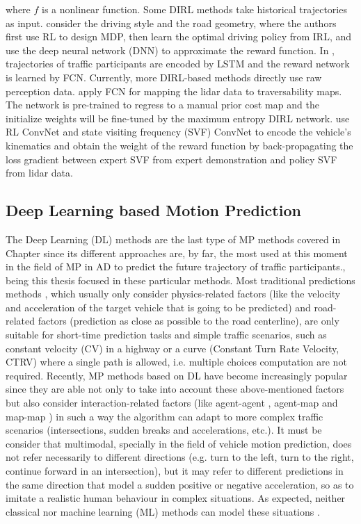 where $f$ is a nonlinear function. Some DIRL methods take historical trajectories as input. \cite{you2019advanced} consider the driving style and the road geometry, where the authors first use RL to design MDP, then learn the optimal driving policy from IRL, and use the deep neural network (DNN) to approximate the reward function. In \cite{fernando2020deep}, trajectories of traffic participants are encoded by LSTM and the reward network is learned by FCN. Currently, more DIRL-based methods directly use raw perception data. \cite{wulfmeier2017large} apply FCN for mapping the lidar data to traversability maps. The network is pre-trained to regress to a manual prior cost map and the initialize weights will be fine-tuned by the maximum entropy DIRL network. \cite{zhu2020off} use RL ConvNet and state visiting frequency (SVF) ConvNet to encode the vehicle’s kinematics and obtain the weight of the reward function by back-propagating the loss gradient \cite{wulfmeier2016watch} between expert SVF from expert demonstration and policy SVF from lidar data.

\subsection{Deep Learning based Motion Prediction}
\label{sec:2_dl_based_mp}

The Deep Learning (DL) methods are the last type of \ac{MP} methods covered in Chapter since its different approaches are, by far, the most used at this moment in the field of \ac{MP} in \ac{AD} to predict the future trajectory of traffic participants., being this thesis focused in these particular methods. Most traditional predictions methods \cite{huang2022survey}, which usually only consider physics-related factors (like the velocity and acceleration of the target vehicle that is going to be predicted) and road-related factors (prediction as close as possible to the road centerline), are only suitable for short-time prediction tasks \cite{huang2022survey} and simple traffic scenarios, such as constant velocity (CV) in a highway or a curve (Constant Turn Rate Velocity, CTRV) where a single path is allowed, i.e. multiple choices computation are not required. Recently, MP methods based on DL have become increasingly popular since they are able not only to take into account these above-mentioned factors but also consider interaction-related factors (like agent-agent \cite{gupta2018social}, agent-map \cite{casas2018intentnet} and map-map \cite{liang2020learning}) in such a way the algorithm can adapt to more complex traffic scenarios (intersections, sudden breaks and accelerations, etc.). It must be consider that multimodal, specially in the field of vehicle motion prediction, does not refer necessarily to different directions (e.g. turn to the left, turn to the right, continue forward in an intersection), but it may refer to different predictions in the same direction that model a sudden positive or negative acceleration, so as to imitate a realistic human behaviour in complex situations. As expected, neither classical nor machine learning (ML) methods can model these situations \cite{huang2022survey}. \\

